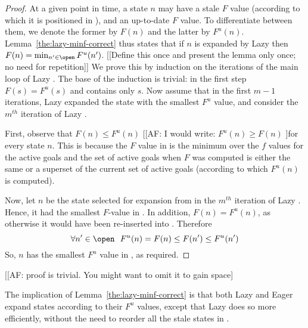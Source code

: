 \begin{proof}

At a given point in time, a state $n$ may have a stale $F$ value (according to which it is positioned in \open), and an up-to-date $F$ value.
To differentiate between them, we denote the former by $F(n)$ and the latter by $F^u(n)$.
Lemma~\ref{the:lazy-minf-correct} thus states that if $n$ is expanded by Lazy \kastarmin then $F(n)=\min_{n'\in \open}F^u(n')$. [[Define this once and present the lemma only once; no need for repetition]]
We prove this by induction on the iterations of the main loop of Lazy \kastarmin.
The base of the induction is trivial: in the first step $F(s)=F^u(s)$ and \open contains only $s$.
Now assume that in the first $m-1$ iterations, Lazy \kastarmin expanded the state with the smallest $F^u$ value, and consider the $m^{th}$ iteration of Lazy \kastarmin.

First, observe that $F(n)\leq F^u(n)$ [[AF: I would write: $F^u(n)\geq F(n)$ ]for every state $n$.
This is because the $F$ value in \kastarmin is the minimum over the $f$ values for the active goals and the set of active goals when $F$ was computed is either the same or a superset of the current set of active goals (according to which $F^u(n)$ is computed).

Now, let $n$ be the state selected for expansion from \open in the $m^{th}$ iteration of Lazy \kastarmin. Hence, it had the smallest $F$-value in \open.
In addition, $F(n)=F^u(n)$, as otherwise it would have been re-inserted into \open.
Therefore
\[ \forall n'\in\open ~~ F^u(n)=F(n)\leq F(n') \leq F^u(n') \]
  So, $n$ has the smallest $F^u$ value in \open, as required.
\end{proof}

[[AF: proof is trivial. You might want to omit it to gain space]

The implication of Lemma~\ref{the:lazy-minf-correct} is that both Lazy \kastarmin and Eager \kastarmin expand states according to their $F^u$ values, except that Lazy \kastarmin does so more efficiently, without the need to reorder all the stale states in \open.

